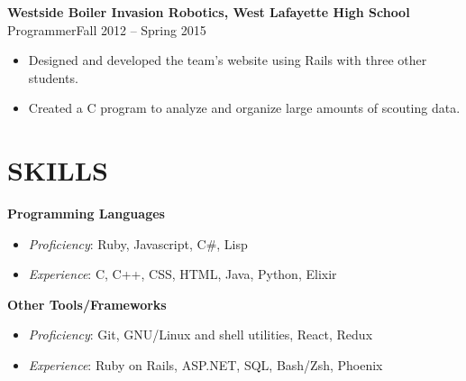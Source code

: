 \documentclass[line,margin]{res}
\begin{document}
\begin{resume}
  {\bf\rmfamily  Westside Boiler Invasion Robotics, West Lafayette High School}\\
  Programmer\hfill Fall 2012 -- Spring 2015
  \begin{itemize}  \itemsep -2pt %
  \item Designed and developed the team's website using Rails with three other students.
  \item Created a C program to analyze and organize large amounts of scouting data.
  \end{itemize}





  \section{SKILLS}
  {\bf\rmfamily Programming Languages}
  \begin{itemize} \itemsep -2pt
  \item \emph{Proficiency}: Ruby, Javascript, C\#, Lisp
  \item \emph{Experience}: C, C++, CSS, HTML, Java, Python, Elixir
  \end{itemize}

  {\bf\rmfamily Other Tools/Frameworks}
  \begin{itemize} \itemsep -2pt
  \item \emph{Proficiency}: Git, GNU/Linux and shell utilities, React, Redux
  \item \emph{Experience}: Ruby on Rails, ASP.NET, SQL, Bash/Zsh, Phoenix
  \end{itemize}


\end{resume}
\end{document}
